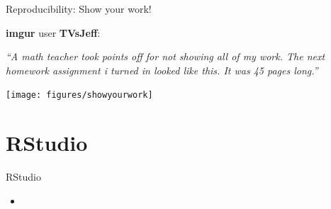 \documentclass{beamer}
\begin{document}
\begin{frame}{Reproducibility: Show your work!}
    \begin{minipage}{.45\textwidth}
\small{
\vspace{0.5cm}

\textbf{imgur} user \textbf{TVsJeff}: 
\vspace{0.5cm}

\emph{``A math teacher took points off for not showing all of my work. The next homework assignment i turned in looked like this. It was 45 pages long.''}}
    \end{minipage}\hfill
    \begin{minipage}{.5\textwidth}
\texttt{[image: figures/showyourwork]}
    \end{minipage}
  
\end{frame}

\section{RStudio}
\begin{frame}{RStudio}
\begin{itemize}
\item 
\end{itemize}
\end{frame}
\end{document}
